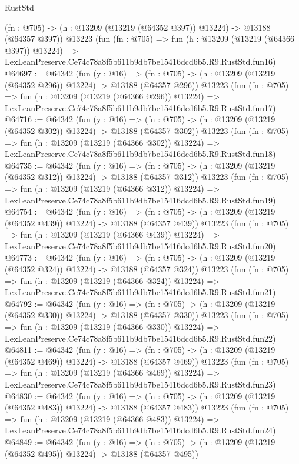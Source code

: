 \begin{lexlean}{RustStd}
\begin{coremodule}
    (fn : @705) -> (h : @13209 (@13219 (@64352 @397)) @13224) -> @13188 (@64357 @397))
    @13223
    (fun (fn : @705) =>
    fun (h : @13209 (@13219 (@64366 @397)) @13224) =>
    LexLeanPreserve.Ce74c78a8f5b611b9db7be15416dcd6b5.R9.RustStd.fun16)
@64697 := @64342
    (fun (y : @16) =>
    (fn : @705) -> (h : @13209 (@13219 (@64352 @296)) @13224) -> @13188 (@64357 @296))
    @13223
    (fun (fn : @705) =>
    fun (h : @13209 (@13219 (@64366 @296)) @13224) =>
    LexLeanPreserve.Ce74c78a8f5b611b9db7be15416dcd6b5.R9.RustStd.fun17)
@64716 := @64342
    (fun (y : @16) =>
    (fn : @705) -> (h : @13209 (@13219 (@64352 @302)) @13224) -> @13188 (@64357 @302))
    @13223
    (fun (fn : @705) =>
    fun (h : @13209 (@13219 (@64366 @302)) @13224) =>
    LexLeanPreserve.Ce74c78a8f5b611b9db7be15416dcd6b5.R9.RustStd.fun18)
@64735 := @64342
    (fun (y : @16) =>
    (fn : @705) -> (h : @13209 (@13219 (@64352 @312)) @13224) -> @13188 (@64357 @312))
    @13223
    (fun (fn : @705) =>
    fun (h : @13209 (@13219 (@64366 @312)) @13224) =>
    LexLeanPreserve.Ce74c78a8f5b611b9db7be15416dcd6b5.R9.RustStd.fun19)
@64754 := @64342
    (fun (y : @16) =>
    (fn : @705) -> (h : @13209 (@13219 (@64352 @439)) @13224) -> @13188 (@64357 @439))
    @13223
    (fun (fn : @705) =>
    fun (h : @13209 (@13219 (@64366 @439)) @13224) =>
    LexLeanPreserve.Ce74c78a8f5b611b9db7be15416dcd6b5.R9.RustStd.fun20)
@64773 := @64342
    (fun (y : @16) =>
    (fn : @705) -> (h : @13209 (@13219 (@64352 @324)) @13224) -> @13188 (@64357 @324))
    @13223
    (fun (fn : @705) =>
    fun (h : @13209 (@13219 (@64366 @324)) @13224) =>
    LexLeanPreserve.Ce74c78a8f5b611b9db7be15416dcd6b5.R9.RustStd.fun21)
@64792 := @64342
    (fun (y : @16) =>
    (fn : @705) -> (h : @13209 (@13219 (@64352 @330)) @13224) -> @13188 (@64357 @330))
    @13223
    (fun (fn : @705) =>
    fun (h : @13209 (@13219 (@64366 @330)) @13224) =>
    LexLeanPreserve.Ce74c78a8f5b611b9db7be15416dcd6b5.R9.RustStd.fun22)
@64811 := @64342
    (fun (y : @16) =>
    (fn : @705) -> (h : @13209 (@13219 (@64352 @469)) @13224) -> @13188 (@64357 @469))
    @13223
    (fun (fn : @705) =>
    fun (h : @13209 (@13219 (@64366 @469)) @13224) =>
    LexLeanPreserve.Ce74c78a8f5b611b9db7be15416dcd6b5.R9.RustStd.fun23)
@64830 := @64342
    (fun (y : @16) =>
    (fn : @705) -> (h : @13209 (@13219 (@64352 @483)) @13224) -> @13188 (@64357 @483))
    @13223
    (fun (fn : @705) =>
    fun (h : @13209 (@13219 (@64366 @483)) @13224) =>
    LexLeanPreserve.Ce74c78a8f5b611b9db7be15416dcd6b5.R9.RustStd.fun24)
@64849 := @64342
    (fun (y : @16) =>
    (fn : @705) -> (h : @13209 (@13219 (@64352 @495)) @13224) -> @13188 (@64357 @495))

\end{coremodule}
\end{lexlean}

